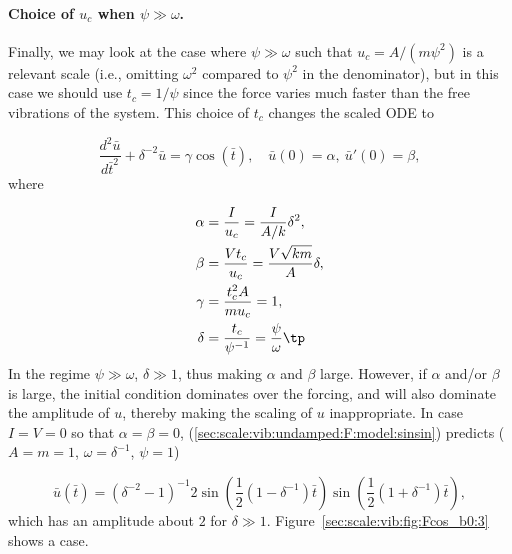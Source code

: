 \documentclass[graybox,envcountchap,sectrefs,final]{svmonodo}
\begin{document}
\paragraph{Choice of $u_c$ when $\psi\gg\omega$.}
Finally, we may look at the case where $\psi\gg\omega$ such that
$u_c=A/(m\psi^2)$ is a relevant scale (i.e., omitting $\omega^2$ compared to
$\psi^2$ in the denominator), but in this case we should
use $t_c=1/\psi$ since the force varies much faster than the
free vibrations of the system.
This choice of $t_c$ changes the scaled ODE to

\begin{equation}
\frac{d^2\bar u}{d\bar t^2} + \delta^{-2}\bar u =
\gamma
\cos(\bar t),
\quad \bar u(0)=\alpha,\ \bar u'(0)=\beta,
\label{sec:scale:vib:undamped:F:model:scaled6}
\end{equation}
where

\begin{align*}
\alpha &= \frac{I}{u_c} = \frac{I}{A/k}\delta^2,\\ 
\beta  &= \frac{Vt_c}{u_c} = \frac{V\sqrt{km}}{A}\delta,\\ 
\gamma &= \frac{t_c^2 A}{mu_c} = 1,\\ 
\delta &= \frac{t_c}{\psi^{-1}} = \frac{\psi}{\omega}\tp
\end{align*}
In the regime $\psi\gg\omega$, $\delta\gg 1$, thus making $\alpha$ and
$\beta$ large.
However, if $\alpha$ and/or $\beta$ is large,
the initial condition dominates over the forcing, and will also dominate
the amplitude of $u$, thereby making the scaling of $u$ inappropriate.
In case $I=V=0$ so that $\alpha=\beta=0$,
(\ref{sec:scale:vib:undamped:F:model:sinsin}) predicts
($A=m=1$, $\omega=\delta^{-1}$, $\psi=1$)

\[ \bar u(\bar t) = (\delta^{-2}-1)^{-1}2
\sin\left(\frac{1}{2}(1 -\delta^{-1})\bar t\right)
\sin\left(\frac{1}{2}(1 +\delta^{-1})\bar t\right),
\]
which has an amplitude about $2$ for $\delta\gg 1$.
Figure~\ref{sec:scale:vib:fig:Fcos_b0:3} shows a case.
\end{document}
